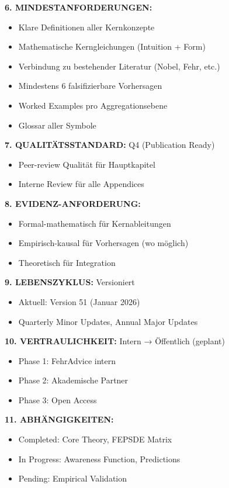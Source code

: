 \documentclass[12pt,a4paper]{article}
\begin{document}
\begin{tcolorbox}[colback=blue!5!white, colframe=blue!75!black, 
    title=EBF Hauptdokument: Vollständige Spezifikation]
\textbf{6. MINDESTANFORDERUNGEN:}
\begin{itemize}[nosep]
\item Klare Definitionen aller Kernkonzepte
\item Mathematische Kerngleichungen (Intuition + Form)
\item Verbindung zu bestehender Literatur (Nobel, Fehr, etc.)
\item Mindestens 6 falsifizierbare Vorhersagen
\item Worked Examples pro Aggregationsebene
\item Glossar aller Symbole
\end{itemize}

\textbf{7. QUALITÄTSSTANDARD:} Q4 (Publication Ready)
\begin{itemize}[nosep]
\item Peer-review Qualität für Hauptkapitel
\item Interne Review für alle Appendices
\end{itemize}

\textbf{8. EVIDENZ-ANFORDERUNG:}
\begin{itemize}[nosep]
\item Formal-mathematisch für Kernableitungen
\item Empirisch-kausal für Vorhersagen (wo möglich)
\item Theoretisch für Integration
\end{itemize}

\textbf{9. LEBENSZYKLUS:} Versioniert
\begin{itemize}[nosep]
\item Aktuell: Version 51 (Januar 2026)
\item Quarterly Minor Updates, Annual Major Updates
\end{itemize}

\textbf{10. VERTRAULICHKEIT:} Intern → Öffentlich (geplant)
\begin{itemize}[nosep]
\item Phase 1: FehrAdvice intern
\item Phase 2: Akademische Partner
\item Phase 3: Open Access
\end{itemize}

\textbf{11. ABHÄNGIGKEITEN:}
\begin{itemize}[nosep]
\item Completed: Core Theory, FEPSDE Matrix
\item In Progress: Awareness Function, Predictions
\item Pending: Empirical Validation
\end{itemize}


\end{tcolorbox}
\end{document}
